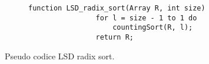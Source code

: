 \documentclass{subfiles}
\begin{document}
\begin{figure}[h!]
    \centering
    \begin{subfigure}[b]{.535\textwidth}
        \begin{lstlisting}[language = PSEUDO]
                function LSD_radix_sort(Array R, int size)
                for l = size - 1 to 1 do 
                    countingSort(R, l);
                return R;
            \end{lstlisting}
    \end{subfigure}
    \caption{Pseudo codice LSD radix sort.}
    \label{Fig:6}
\end{figure}
\end{document}
